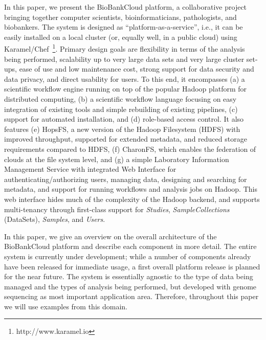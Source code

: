 In this paper, we present the BioBankCloud platform, a collaborative project bringing together computer scientists, bioinformaticians, pathologists, and biobankers. The system is designed as ``platform-as-a-service'', i.e., it can be easily installed on a local cluster (or, equally well, in a public cloud) using Karamel/Chef~\footnote{http://www.karamel.io}. Primary design goals are flexibility in terms of the analysis being performed, scalability up to very large data sets and very large cluster set-ups, ease of use and low maintenance cost, strong support for data security and data privacy, and direct usability for users. To this end, it encompasses (a) a scientific workflow engine running on top of the popular Hadoop platform for distributed computing, (b) a scientific workflow language focusing on easy integration of existing tools and simple rebuilding of existing pipelines, (c) support for automated installation, and (d) role-based access control. It also features (e) HopsFS, a new version of the Hadoop Filesystem (HDFS) with improved throughput, supported for extended metadata, and reduced storage requirements compared to HDFS, (f) CharonFS, which enables the federation of clouds at the file system level, and (g) a simple Laboratory Information Management Service with integrated Web Interface for authenticating/authorizing users, managing data, designing and searching for metadata, and support for running workflows and analysis jobs on Hadoop. This web interface hides much of the complexity of the Hadoop backend, and supports multi-tenancy through first-class support for \textit{Studies}, \textit{SampleCollections} (DataSets), \textit{Samples}, and \textit{Users}. 

In this paper, we give an overview on the overall architecture of the BioBankCloud platform and describe each component in more detail. The entire system is currently under development; while a number of components already have been released for immediate usage, a first overall platform release is planned for the near future. The system is essentially agnostic to the type of data being managed and the types of analysis being performed, but developed with genome sequencing as most important application area. Therefore, throughout this paper we will use examples from this domain. 